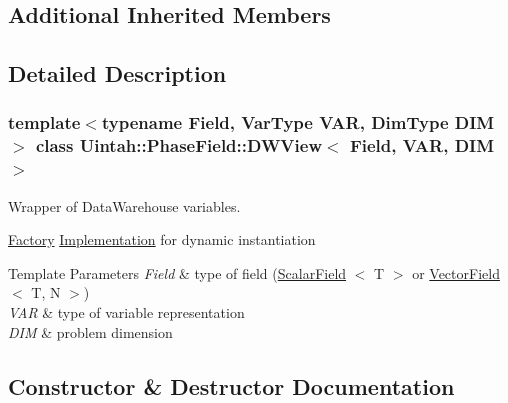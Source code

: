 \subsection*{Additional Inherited Members}


\subsection{Detailed Description}
\subsubsection*{template$<$typename Field, Var\+Type V\+AR, Dim\+Type D\+IM$>$\newline
class Uintah\+::\+Phase\+Field\+::\+D\+W\+View$<$ Field, V\+A\+R, D\+I\+M $>$}

Wrapper of Data\+Warehouse variables. 

\hyperlink{classUintah_1_1PhaseField_1_1Factory}{Factory} \hyperlink{classUintah_1_1PhaseField_1_1Implementation}{Implementation} for dynamic instantiation


\begin{DoxyTemplParams}{Template Parameters}
{\em Field} & type of field (\hyperlink{structUintah_1_1PhaseField_1_1ScalarField}{Scalar\+Field} $<$ T $>$ or \hyperlink{structUintah_1_1PhaseField_1_1VectorField}{Vector\+Field} $<$ T, N $>$) \\
\hline
{\em V\+AR} & type of variable representation \\
\hline
{\em D\+IM} & problem dimension \\
\hline
\end{DoxyTemplParams}


\subsection{Constructor \& Destructor Documentation}
\mbox{\label{classUintah_1_1PhaseField_1_1DWView_af33d78220bb536a0402193528a1554ec}} 
